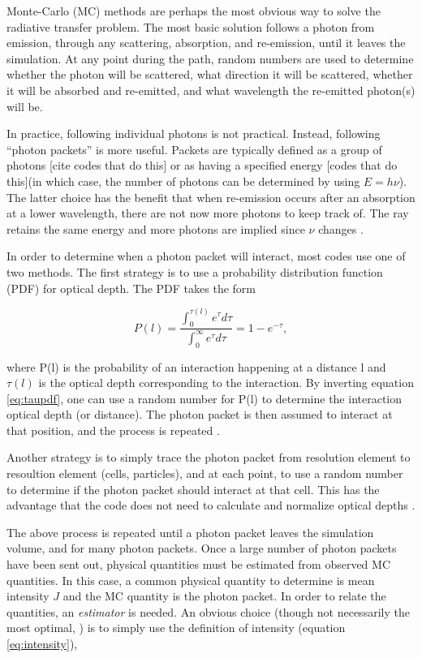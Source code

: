 Monte-Carlo (MC) methods are perhaps the most obvious way to solve the radiative transfer problem. The most basic solution follows a photon from emission, through any scattering, absorption, and re-emission, until it leaves the simulation. At any point during the path, random numbers are used to determine whether the photon will be scattered, what direction it will be scattered, whether it will be absorbed and re-emitted, and what wavelength the re-emitted photon(s) will be.

In practice, following individual photons is not practical. Instead, following ``photon packets'' is more useful. Packets are typically defined as a group of photons [cite codes that do this] or as having a specified energy [codes that do this](in which case, the number of photons can be determined by using $E = h\nu$). The latter choice has the benefit that when re-emission occurs after an absorption at a lower wavelength, there are not now more photons to keep track of. The ray retains the same energy and more photons are implied since $\nu$ changes \citep{ercolanoEt03,abbottLucy85}.

In order to determine when a photon packet will interact, most codes use one of two methods. The first strategy is to use a probability distribution function (PDF) for optical depth. The PDF takes the form

\begin{equation}
\label{eq:taupdf}
P(l) = \frac{\int_0^{\tau(l)}e^{\tau}d\tau}{\int_0^{\infty}e^{\tau}d\tau} = 1-e^{-\tau},
\end{equation}

where P(l) is the probability of an interaction happening at a distance l and $\tau(l)$ is the optical depth corresponding to the interaction. By inverting equation \ref{eq:taupdf}, one can use a random number for P(l) to determine the interaction optical depth (or distance). The photon packet is then assumed to interact at that position, and the process is repeated \citep{harriesHowarth97}.

Another strategy is to simply trace the photon packet from resolution element to resoultion element (cells, particles), and at each point, to use a random number to determine if the photon packet should interact at that cell. This has the advantage that the code does not need to calculate and normalize optical depths \citep{lucy99,ercolanoEt03}.

The above process is repeated until a photon packet leaves the simulation volume, and for many photon packets. Once a large number of photon packets have been sent out, physical quantities must be estimated from observed MC quantities. In this case, a common physical quantity to determine is mean intensity $J$ and the MC quantity is the photon packet. In order to relate the quantities, an \emph{estimator} is needed. An obvious choice (though not necessarily the most optimal, \citet{ercolanoEt03}) is to simply use the definition of intensity (equation \ref{eq:intensity}),

